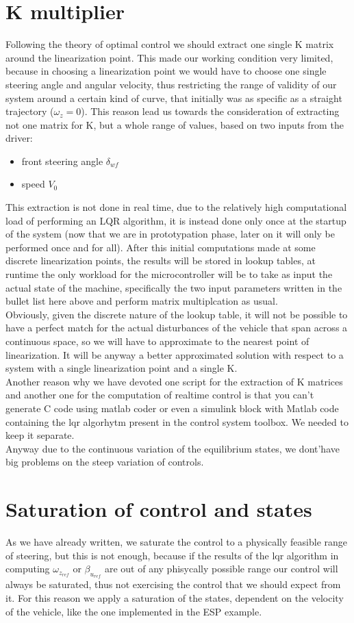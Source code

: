\section{K multiplier}
Following the theory of optimal control we should extract one single K matrix around the linearization point. This made our working condition very limited, because in choosing a linearization point we would have to choose one single steering angle and angular velocity, thus restricting the range of validity of our system around a certain kind of curve, that initially was as specific as a straight trajectory ($\omega_{z}=0$).
This reason lead us towards the consideration of extracting not one matrix for K, but a whole range of values, based on two inputs from the driver:
\begin{itemize}
	\item front steering angle $\delta_{wf}$
	\item speed $V_0$
\end{itemize}	
This extraction is not done in real time, due to the relatively high computational load of performing an LQR algorithm, it is instead done only once at the startup of the system (now that we are in prototypation phase, later on it will only be performed once and for all). After this initial computations made at some discrete linearization points, the results will be stored in lookup tables, at runtime the only workload for the microcontroller will be to take as input the actual state of the machine, specifically the two input parameters written in the bullet list here above and perform matrix multiplcation as usual.\\
Obviously, given the discrete nature of the lookup table, it will not be possible to have a perfect match for the actual disturbances of the vehicle that span across a continuous space, so we will have to approximate to the nearest point of linearization. It will be anyway a better approximated solution with respect to a system with a single linearization point and a single K.\\
Another reason why we have devoted one script for the extraction of K matrices and another one for the computation of realtime control is that you can't generate C code using matlab coder or even a simulink block with Matlab code containing the lqr algorhytm present in the control system toolbox. We needed to keep it separate.\\
Anyway due to the continuous variation of the equilibrium states, we dont'have big problems on the steep variation of controls.
\section{Saturation of control and states}
As we have already written, we saturate the control to a physically feasible range of steering, but this is not enough, because if the results of the lqr algorithm in computing $\omega_{z_{ref}}$ or $\beta_{u_{ref}}$ are out of any phisycally possible range our control will always be saturated, thus not exercising the control that we should expect from it. For this reason we apply a saturation of the states, dependent on the velocity of the vehicle, like the one implemented in the ESP example.
